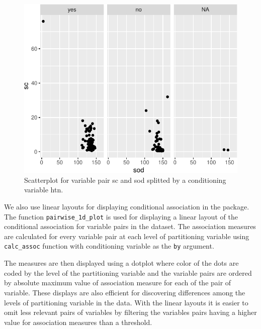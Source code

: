 \begin{Schunk}
\begin{figure}

{\centering \includegraphics{rj_paper_files/figure-latex/high-diff-1} 

}

\caption[Scatterplot for variable pair sc and sod splitted by a conditioning variable htn]{Scatterplot for variable pair sc and sod splitted by a conditioning variable htn.}\label{fig:high-diff}
\end{figure}
\end{Schunk}

We also use linear layouts for displaying conditional association in the
package. The function \texttt{pairwise\_1d\_plot} is used for displaying
a linear layout of the conditional association for variable pairs in the
dataset. The association measures are calculated for every variable pair
at each level of partitioning variable using \texttt{calc\_assoc}
function with conditioning variable as the \texttt{by} argument.

The measures are then displayed using a dotplot where color of the dots
are coded by the level of the partitioning variable and the variable
pairs are ordered by absolute maximum value of association measure for
each of the pair of variable. These displays are also efficient for
discovering differences among the levels of partitioning variable in the
data. With the linear layouts it is easier to omit less relevant pairs
of variables by filtering the variables pairs having a higher value for
association measures than a threshold.

